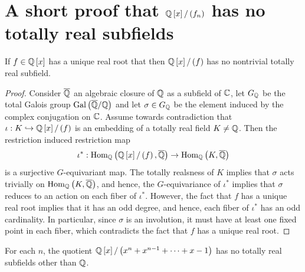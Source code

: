 \documentclass[../main.tex]{subfiles}
\begin{document}
\section{A short proof that $\mathbb{Q}\left[ x \right] / \left( f_n \right)$ has no totally real subfields}
\begin{lemma}
  If $f \in \mathbb{Q}\left[ x \right]$ has a unique real root that then $\mathbb{Q}\left[ x \right] / \left( f \right)$ has no nontrivial totally real subfield.
\end{lemma}
\begin{proof}
  Consider $\overline{\mathbb{Q}}$ an algebraic closure of $\mathbb{Q}$ as a subfield of $\mathbb{C}$, let $G_{\mathbb{Q}}$ be the total Galois group $\operatorname{Gal}\left( \overline{\mathbb{Q}} / \mathbb{Q} \right)$ and let $\sigma \in G_{\mathbb{Q}}$ be the element induced by the complex conjugation on $\mathbb{C}$.
  Assume towards contradiction that $\iota: K \hookrightarrow \mathbb{Q}\left[ x \right] / \left( f \right)$ is an embedding of a totally real field $K \neq \mathbb{Q}$.
  Then the restriction induced restriction map 
  \[
    \iota^*: \operatorname{\rm Hom}_{\mathbb{Q}}\left( \mathbb{Q}\left[ x \right] / \left( f \right), \overline{\mathbb{Q}} \right) \to \operatorname{\rm Hom}_{\mathbb{Q}}\left( K, \overline{\mathbb{Q}} \right)
  \]
  is a surjective $G$-equivariant map.
  The totally realsness of $K$ implies that $\sigma$ acts trivially on $\operatorname{\rm Hom}_{\mathbb{Q}}\left( K, \overline{\mathbb{Q}} \right)$, and hence, the $G$-equivariance of $\iota^*$ implies that $\sigma$ reduces to an action on each fiber of $\iota^*$.
  However, the fact that $f$ has a unique real root implies that it has an odd degree, and hence, each fiber of $\iota^*$ has an odd cardinality.
  In particular, since $\sigma$ is an involution, it must have at least one fixed point in each fiber, which contradicts the fact that $f$ has a unique real root.  
\end{proof}
\begin{corollary}
  For each $n$, the quotient $\mathbb{Q}\left[ x \right] / \left( x^n + x^{n-1} + \dots + x - 1 \right)$ has no totally real subfields other than $\mathbb{Q}$.
\end{corollary}
\end{document}
